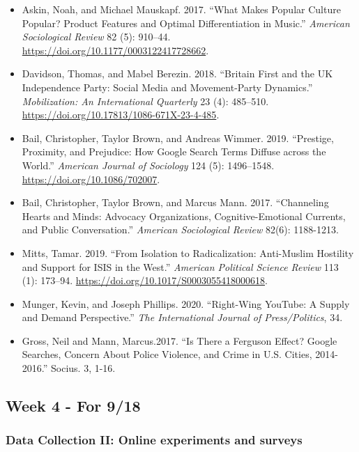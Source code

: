 \documentclass[
  10pt,
]{article}
\providecommand{\tightlist}{%
  \setlength{\itemsep}{0pt}\setlength{\parskip}{0pt}}
\begin{document}
\begin{itemize}
\tightlist
\item
  Askin, Noah, and Michael Mauskapf. 2017. ``What Makes Popular Culture
  Popular? Product Features and Optimal Differentiation in Music.''
  \emph{American Sociological Review} 82 (5): 910--44.
  \url{https://doi.org/10.1177/0003122417728662}.
\item
  Davidson, Thomas, and Mabel Berezin. 2018. ``Britain First and the UK
  Independence Party: Social Media and Movement-Party Dynamics.''
  \emph{Mobilization: An International Quarterly} 23 (4): 485--510.
  \url{https://doi.org/10.17813/1086-671X-23-4-485}.
\item
  Bail, Christopher, Taylor Brown, and Andreas Wimmer. 2019. ``Prestige,
  Proximity, and Prejudice: How Google Search Terms Diffuse across the
  World.'' \emph{American Journal of Sociology} 124 (5): 1496--1548.
  \url{https://doi.org/10.1086/702007}.
\item
  Bail, Christopher, Taylor Brown, and Marcus Mann. 2017. ``Channeling
  Hearts and Minds: Advocacy Organizations, Cognitive-Emotional
  Currents, and Public Conversation.'' \emph{American Sociological
  Review} 82(6): 1188-1213.
\item
  Mitts, Tamar. 2019. ``From Isolation to Radicalization: Anti-Muslim
  Hostility and Support for ISIS in the West.'' \emph{American Political
  Science Review} 113 (1): 173--94.
  \url{https://doi.org/10.1017/S0003055418000618}.
\item
  Munger, Kevin, and Joseph Phillips. 2020. ``Right-Wing YouTube: A
  Supply and Demand Perspective.'' \emph{The International Journal of
  Press/Politics}, 34.
\item
  Gross, Neil and Mann, Marcus.2017. ``Is There a Ferguson Effect?
  Google Searches, Concern About Police Violence, and Crime in U.S.
  Cities, 2014-2016.'' Socius. 3, 1-16.
\end{itemize}

\hypertarget{week-4---for-918}{%
\subsection{Week 4 - For 9/18}\label{week-4---for-918}}

\hypertarget{data-collection-ii-online-experiments-and-surveys}{%
\subsubsection{Data Collection II: Online experiments and
surveys}\label{data-collection-ii-online-experiments-and-surveys}}
\end{document}
